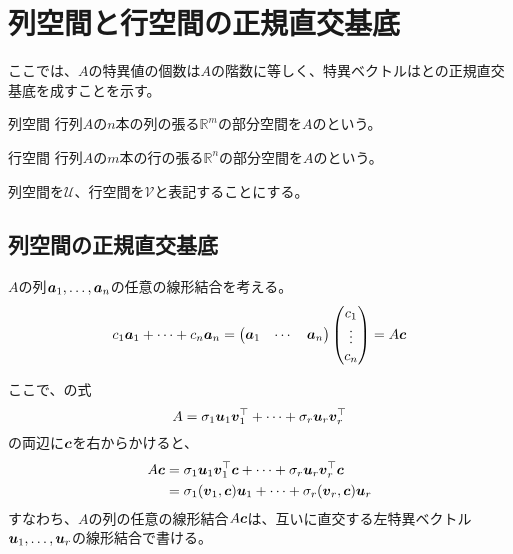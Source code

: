 \documentclass[../../../topic_linear-algebra]{subfiles}
\begin{document}
\sectionline
\section{列空間と行空間の正規直交基底}

ここでは、$A$の特異値の個数は$A$の階数に等しく、特異ベクトルはとの正規直交基底を成すことを示す。

\begin{definition*}{列空間}
  行列$A$の$n$本の列の張る$\mathbb{R}^m$の部分空間を$A$のという。
\end{definition*}

\begin{definition*}{行空間}
  行列$A$の$m$本の行の張る$\mathbb{R}^n$の部分空間を$A$のという。
\end{definition*}

列空間を$\mathcal{U}$、行空間を$\mathcal{V}$と表記することにする。

\subsection{列空間の正規直交基底}

$A$の列$\vb*{a}_1,\ldots,\vb*{a}_n$の任意の線形結合を考える。
\begin{equation*}
  c_1 \vb*{a}_1 + \cdots + c_n \vb*{a}_n = \begin{pmatrix}
    \vb*{a}_1 & \cdots & \vb*{a}_n
  \end{pmatrix} \begin{pmatrix}
    c_1    \\
    \vdots \\
    c_n
  \end{pmatrix} = A \vb*{c}
\end{equation*}

ここで、の式
\begin{equation*}
  A = \sigma_1\vb*{u}_1\vb*{v}_1^\top + \cdots + \sigma_r \vb*{u}_r \vb*{v}_r^\top
\end{equation*}
の両辺に$\vb*{c}$を右からかけると、
\begin{align*}
  A \vb*{c} & = \sigma_1\vb*{u}_1\vb*{v}_1^\top \vb*{c} + \cdots + \sigma_r \vb*{u}_r \vb*{v}_r^\top \vb*{c} \\
            & = \sigma_1 (\vb*{v}_1, \vb*{c}) \vb*{u}_1 + \cdots + \sigma_r (\vb*{v}_r, \vb*{c}) \vb*{u}_r
\end{align*}
すなわち、$A$の列の任意の線形結合$A\vb*{c}$は、互いに直交する左特異ベクトル$\vb*{u}_1,\ldots,\vb*{u}_r$の線形結合で書ける。
\end{document}
